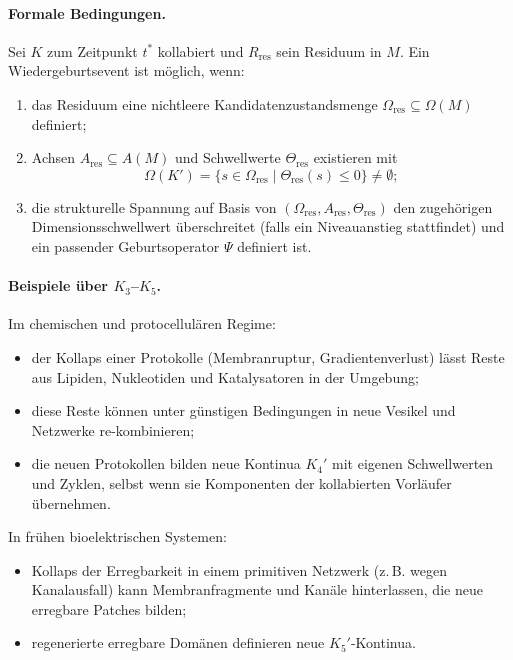 \paragraph{Formale Bedingungen.}
Sei \(K\) zum Zeitpunkt \(t^{\ast}\) kollabiert und \(R_{\mathrm{res}}\) sein
Residuum in \(M\). Ein Wiedergeburtsevent ist möglich, wenn:
\begin{enumerate}
  \item das Residuum eine nichtleere Kandidatenzustandsmenge
        \(\Omega_{\mathrm{res}}\subseteq \Omega(M)\) definiert;
  \item Achsen \(A_{\mathrm{res}}\subseteq A(M)\) und Schwellwerte
        \(\Theta_{\mathrm{res}}\) existieren mit
        \[
          \Omega(K') =
            \{ s\in \Omega_{\mathrm{res}}
               \mid \Theta_{\mathrm{res}}(s)\le 0
            \}
          \neq \emptyset;
        \]
  \item die strukturelle Spannung auf Basis von
        \((\Omega_{\mathrm{res}},A_{\mathrm{res}},\Theta_{\mathrm{res}})\)
        den zugehörigen Dimensionsschwellwert überschreitet (falls ein
        Niveauanstieg stattfindet) und ein passender Geburtsoperator
        \(\Psi\) definiert ist.
\end{enumerate}

\paragraph{Beispiele über \texorpdfstring{\(K_3\)}{K_3}–\texorpdfstring{\(K_5\)}{K_5}.}
Im chemischen und protocellulären Regime:
\begin{itemize}
  \item der Kollaps einer Protokolle (Membranruptur, Gradientenverlust) lässt
        Reste aus Lipiden, Nukleotiden und Katalysatoren in der Umgebung;
  \item diese Reste können unter günstigen Bedingungen in neue Vesikel und
        Netzwerke re-kombinieren;
  \item die neuen Protokollen bilden neue Kontinua \(K_4'\) mit eigenen
        Schwellwerten und Zyklen, selbst wenn sie Komponenten der kollabierten
        Vorläufer übernehmen.
\end{itemize}

In frühen bioelektrischen Systemen:
\begin{itemize}
  \item Kollaps der Erregbarkeit in einem primitiven Netzwerk (z.\,B. wegen
        Kanalausfall) kann Membranfragmente und Kanäle hinterlassen, die neue
        erregbare Patches bilden;
  \item regenerierte erregbare Domänen definieren neue \(K_5'\)-Kontinua.
\end{itemize}

